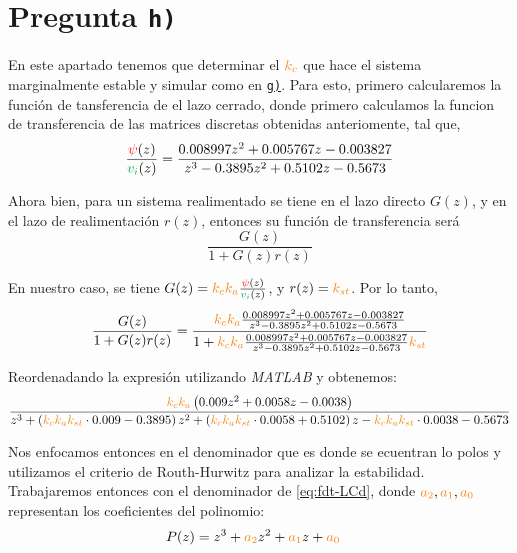\section{Pregunta \texttt{h)}}\label{pregunta-h}


En este apartado tenemos que determinar el $\nara{k_c}$  que hace el sistema
marginalmente estable y simular como en \hyperref[pregunta-g]{\texttt{g)}}. Para
esto, primero calcularemos la función de tansferencia de el lazo cerrado, donde
primero calculamos la funcion de transferencia de las matrices discretas obtenidas
anteriomente, tal que,
\begin{equation}
   \frac{\rojo{\psi}(z)}{\verd{v_{i}}(z)} = \frac{0.008997z^2 + 0.005767 z - 0.003827}
    {z^3 - 0.3895 z^2 + 0.5102 z -0.5673}
\end{equation}

Ahora bien, para un sistema realimentado se tiene en el lazo directo $G(z)$, y 
en el lazo de realimentación $r(z)$, entonces su función de transferencia será
\begin{equation}
    \frac{G(z)}{1 + G(z)r(z)}
\end{equation}

En nuestro caso, se tiene $G(z) = \nara{k_{c} k_{a}} \frac{\rojo{\psi}(z)}{\verd{v_i}(z)}$,
y $r(z) = \nara{k_{st}}$. Por lo tanto,
\begin{equation}
    \frac{G(z)}{1 + G(z)r(z)} = \dfrac{\nara{k_ck_a} \frac{0.008997z^2 + 0.005767 z - 0.003827}
    {z^3 - 0.3895 z^2 + 0.5102 z -0.5673}}
    {1+\nara{k_ck_a} \frac{0.008997z^2 + 0.005767 z - 0.003827}
    {z^3 - 0.3895 z^2 + 0.5102 z -0.5673}\nara{k_{st}}}
\end{equation}

Reordenadando la expresión utilizando \textit{MATLAB} y obtenemos:
\begin{equation}\label{eq:fdt-LCd}
    \frac{ \nara{k_c k_a} \left( 0.009 z^2 + 0.0058 z - 0.0038 \right)}
    { z^3 + \left( \nara{k_c k_a k_{st}} \cdot 0.009 - 0.3895 \right) z^2 
    + \left( \nara{k_c k_a k_{st}} \cdot 0.0058 + 0.5102 \right) z 
    - \nara{k_c k_a k_{st}} \cdot 0.0038 - 0.5673 }
\end{equation}

Nos enfocamos entonces en el denominador que es donde se ecuentran lo polos y
utilizamos el criterio de Routh-Hurwitz para analizar la estabilidad. 
Trabajaremos entonces con el denominador de \eqref{eq:fdt-LCd}, donde $\nara{a_2},\nara{a_1},\nara{a_0}$
representan los coeficientes del polinomio:
\begin{align}
    P(z) =  z^3 + \nara{a_2} z^2 + \nara{a_1} z + \nara{a_0} &
\end{align}

